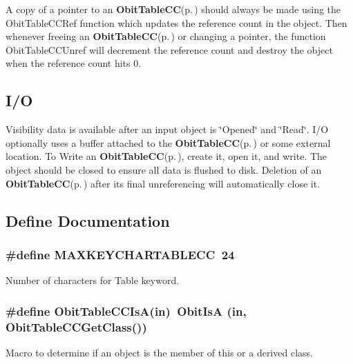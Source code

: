 A copy of a pointer to an {\bf Obit\-Table\-CC}{\rm (p.\,\pageref{structObitTableCC})} should always be made using the Obit\-Table\-CCRef function which updates the reference count in the object. Then whenever freeing an {\bf Obit\-Table\-CC}{\rm (p.\,\pageref{structObitTableCC})} or changing a pointer, the function Obit\-Table\-CCUnref will decrement the reference count and destroy the object when the reference count hits 0.\subsection{I/O}\label{ObitTableCC_8h_ObitTableCCUsage}
Visibility data is available after an input object is \char`\"{}Opened\char`\"{} and \char`\"{}Read\char`\"{}. I/O optionally uses a buffer attached to the {\bf Obit\-Table\-CC}{\rm (p.\,\pageref{structObitTableCC})} or some external location. To Write an {\bf Obit\-Table\-CC}{\rm (p.\,\pageref{structObitTableCC})}, create it, open it, and write. The object should be closed to ensure all data is flushed to disk. Deletion of an {\bf Obit\-Table\-CC}{\rm (p.\,\pageref{structObitTableCC})} after its final unreferencing will automatically close it.

\subsection{Define Documentation}
\subsubsection{\setlength{\rightskip}{0pt plus 5cm}\#define MAXKEYCHARTABLECC\ 24}\label{ObitTableCC_8h_a0}


Number of characters for Table keyword. 

\subsubsection{\setlength{\rightskip}{0pt plus 5cm}\#define Obit\-Table\-CCIs\-A(in)\ Obit\-Is\-A (in, Obit\-Table\-CCGet\-Class())}\label{ObitTableCC_8h_a3}


Macro to determine if an object is the member of this or a derived class. 

